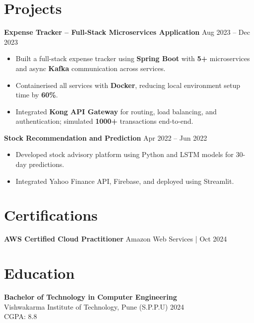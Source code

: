 \documentclass[a4paper,10pt]{article}
\begin{document}
\section*{Projects}

\textbf{Expense Tracker -- Full-Stack Microservices Application} \hfill Aug 2023 -- Dec 2023
\begin{itemize}[leftmargin=*]
    \item Built a full-stack expense tracker using \textbf{Spring Boot} with \textbf{5+} microservices and async \textbf{Kafka} communication across services.
    \item Containerised all services with \textbf{Docker}, reducing local environment setup time by \textbf{60\%}.
    \item Integrated \textbf{Kong API Gateway} for routing, load balancing, and authentication; simulated \textbf{1000+} transactions end-to-end.
\end{itemize}
\textbf{Stock Recommendation and Prediction} \hfill Apr 2022 -- Jun 2022
\begin{itemize}[leftmargin=*]
    \item Developed stock advisory platform using Python and LSTM models for 30-day predictions.
    \item Integrated Yahoo Finance API, Firebase, and deployed using Streamlit.
\end{itemize}

\section*{Certifications}
\textbf{AWS Certified Cloud Practitioner} \hfill Amazon Web Services \;|\; Oct 2024 \\

\section*{Education}

\textbf{Bachelor of Technology in Computer Engineering} \\
Vishwakarma Institute of Technology, Pune (S.P.P.U) \hfill 2024 \\
CGPA: 8.8
\end{document}
